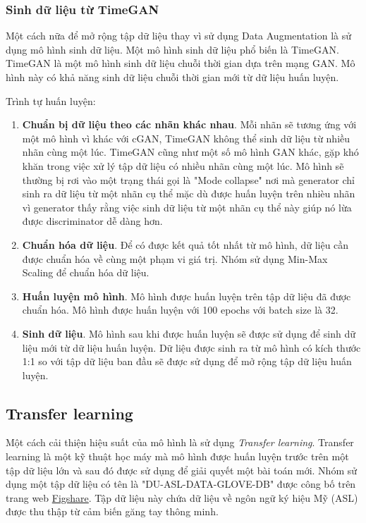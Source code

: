 \subsubsection{Sinh dữ liệu từ TimeGAN}
Một cách nữa để mở rộng tập dữ liệu thay vì sử dụng Data Augmentation là sử dụng mô hình sinh dữ liệu. Một mô hình sinh dữ liệu phổ biến là TimeGAN. TimeGAN là một mô hình sinh dữ liệu chuỗi thời gian dựa trên mạng GAN. Mô hình này có khả năng sinh dữ liệu chuỗi thời gian mới từ dữ liệu huấn luyện.

Trình tự huấn luyện:
\begin{enumerate}
    \item \textbf{Chuẩn bị dữ liệu theo các nhãn khác nhau}. Mỗi nhãn sẽ tương ứng với một mô hình vì khác với cGAN, TimeGAN không thể sinh dữ liệu từ nhiều nhãn cùng một lúc. TimeGAN cũng như một số mô hình GAN khác, gặp khó khăn trong việc xử lý tập dữ liệu có nhiều nhãn cùng một lúc. Mô hình sẽ thường bị rơi vào một trạng thái gọi là "Mode collapse" nơi mà generator chỉ sinh ra dữ liệu từ một nhãn cụ thể mặc dù được huấn luyện trên nhièu nhãn vì generator thấy rằng việc sinh dữ liệu từ một nhãn cụ thể này giúp nó lừa được discriminator dễ dàng hơn.
    \item \textbf{Chuẩn hóa dữ liệu}. Để có được kết quả tốt nhất từ mô hình, dữ liệu cần được chuẩn hóa về cùng một phạm vi giá trị. Nhóm sử dụng Min-Max Scaling để chuẩn hóa dữ liệu.
    \item \textbf{Huấn luyện mô hình}. Mô hình được huấn luyện trên tập dữ liệu đã được chuẩn hóa. Mô hình được huấn luyện với 100 epochs với batch size là 32.
    \item \textbf{Sinh dữ liệu}. Mô hình sau khi được huấn luyện sẽ được sử dụng để sinh dữ liệu mới từ dữ liệu huấn luyện. Dữ liệu được sinh ra từ mô hình có kích thước 1:1 so với tập dữ liệu ban đầu sẽ được sử dụng để mở rộng tập dữ liệu huấn luyện.
\end{enumerate}

\subsection{Transfer learning}
Một cách cải thiện hiệu suất của mô hình là sử dụng \textit{Transfer learning}. Transfer learning là một kỹ thuật học máy mà mô hình được huấn luyện trước trên một tập dữ liệu lớn và sau đó được sử dụng để giải quyết một bài toán mới. Nhóm sử dụng một tập dữ liệu có tên là "DU-ASL-DATA-GLOVE-DB" được công bố trên trang web \href{https://figshare.com/articles/dataset/ASL-Sensor-Dataglove-Dataset_zip/20031017?file=35776586}{Figshare}. Tập dữ liệu này chứa dữ liệu về ngôn ngữ ký hiệu Mỹ (ASL) được thu thập từ cảm biến găng tay thông minh.

